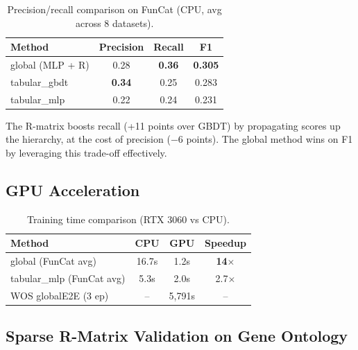 \documentclass[11pt,a4paper]{article}
\begin{document}
\begin{table}[h]
\centering
\caption{Precision/recall comparison on FunCat (CPU, avg across 8 datasets).}
\label{tab:pr}
\begin{tabular}{lccc}
\toprule
\textbf{Method} & \textbf{Precision} & \textbf{Recall} & \textbf{F1} \\
\midrule
global (MLP + R)    & 0.28 & \textbf{0.36} & \textbf{0.305} \\
tabular\_gbdt       & \textbf{0.34} & 0.25 & 0.283 \\
tabular\_mlp        & 0.22 & 0.24 & 0.231 \\
\bottomrule
\end{tabular}
\end{table}

The R-matrix boosts recall (+11 points over GBDT) by propagating
scores up the hierarchy, at the cost of precision ($-6$ points). The
global method wins on F1 by leveraging this trade-off effectively.

\subsection{GPU Acceleration}

\begin{table}[h]
\centering
\caption{Training time comparison (RTX 3060 vs CPU).}
\label{tab:gpu}
\begin{tabular}{lccc}
\toprule
\textbf{Method} & \textbf{CPU} & \textbf{GPU} & \textbf{Speedup} \\
\midrule
global (FunCat avg) & 16.7s & 1.2s & \textbf{14$\times$} \\
tabular\_mlp (FunCat avg) & 5.3s & 2.0s & 2.7$\times$ \\
WOS globalE2E (3 ep) & -- & 5,791s & -- \\
\bottomrule
\end{tabular}
\end{table}

\subsection{Sparse R-Matrix Validation on Gene Ontology}
\label{sec:go_results}
\end{document}

